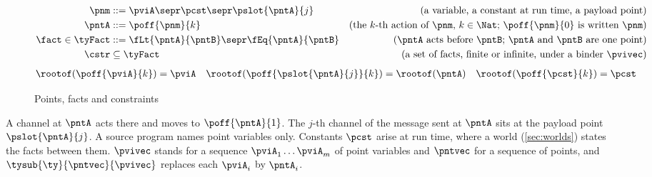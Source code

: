 \begin{figure}[tp]
  \adjustfigure[]
  \begin{align*}
    \pnm &::= \pviA \sepr \pcst \sepr \pslot{\pntA}{j}
    & \text{(a variable, a constant at run time, a payload point)}
    \\
    \pntA &::= \poff{\pnm}{k}
    & \text{(the $k$-th action of $\pnm$, $k \in \Nat$; $\poff{\pnm}{0}$ is written $\pnm$)}
    \\
    \fact \in \tyFact &::= \fLt{\pntA}{\pntB} \sepr \fEq{\pntA}{\pntB}
    & \text{($\pntA$ acts before $\pntB$; $\pntA$ and $\pntB$ are one point)}
    \\
    \cstr &\subseteq \tyFact
    & \text{(a set of facts, finite or infinite, under a binder $\pvivec$)}
  \end{align*}
  \begin{align*}
    \rootof(\poff{\pviA}{k}) &= \pviA
    &
    \rootof(\poff{\pslot{\pntA}{j}}{k}) &= \rootof(\pntA)
    &
    \rootof(\poff{\pcst}{k}) &= \pcst
  \end{align*}
  \caption{Points, facts and constraints}
  \label{fig:points}
\end{figure}

A channel at $\pntA$ acts there and moves to $\poff{\pntA}{1}$. The
$j$-th channel of the message sent at $\pntA$ sits at the payload point
$\pslot{\pntA}{j}$. A source program names point variables only.
Constants $\pcst$ arise at run time, where a world (\cref{sec:worlds})
states the facts between them.
$\pvivec$ stands for a sequence $\pviA_1 \dots \pviA_m$ of point
variables and $\pntvec$ for a sequence of points, and
$\tysub{\ty}{\pntvec}{\pvivec}$ replaces each $\pviA_i$ by $\pntA_i$.

